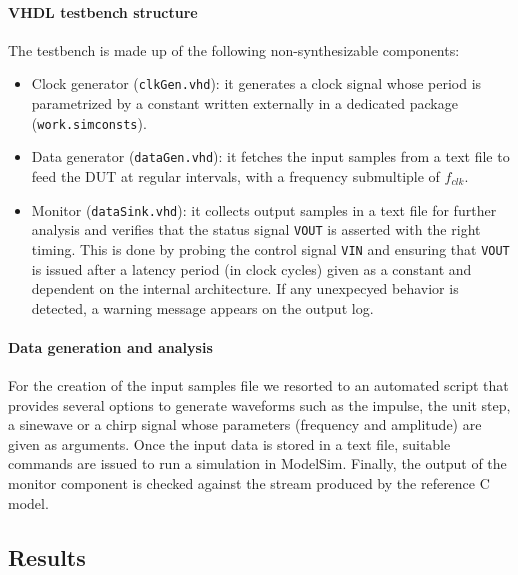 \paragraph{VHDL testbench structure} The testbench is made up of the following non-synthesizable components:
\begin{itemize}
	\item Clock generator (\texttt{clkGen.vhd}): it generates a clock signal whose period is parametrized by a constant written externally in a dedicated package (\texttt{work.simconsts}).
	\item Data generator (\texttt{dataGen.vhd}): it fetches the input samples from a text file to feed the DUT at regular intervals, with a frequency submultiple of $f_{clk}$.
	\item Monitor (\texttt{dataSink.vhd}): it collects output samples in a text file for further analysis and verifies that the status signal \texttt{VOUT} is asserted with the right timing. This is done by probing the control signal \texttt{VIN} and ensuring that \texttt{VOUT} is issued after a latency period (in clock cycles) given as a constant and dependent on the internal architecture. If any unexpecyed behavior is detected, a warning message appears on the output log.
\end{itemize}

\paragraph{Data generation and analysis} For the creation of the input samples file we resorted to an automated script that provides several options to generate waveforms such as the impulse, the unit step, a sinewave or a chirp signal whose parameters (frequency and amplitude) are given as arguments. Once the input data is stored in a text file, suitable commands are issued to run a simulation in ModelSim. Finally, the output of the monitor component is checked against the stream produced by the reference C model. 

\subsection{Results}